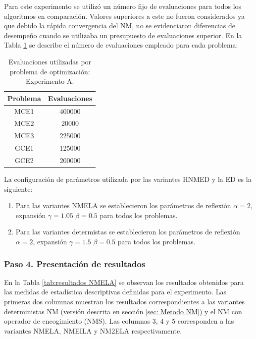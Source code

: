  Para este experimento se utilizó un número fijo de evaluaciones para todos los algoritmos en comparación. Valores superiores a este no fueron considerados ya que debido la rápida convergencia del NM, no se evidenciaron diferencias de desempeño cuando se utilizaba un presupuesto de evaluaciones superior. En la Tabla \ref{tab:Evaluaciones utilizadas por problema de optimización: Experimento A.} se describe el número de evaluaciones empleado para cada problema:
 
 \begin{table}[hb]
 	\centering
 	\caption{Evaluaciones utilizadas por problema de optimización: Experimento A.}
 	\label{tab:Evaluaciones utilizadas por problema de optimización: Experimento A.}
 	\begin{tabular}{cc}
 		\textbf{Problema} &   \textbf{Evaluaciones}     \\
 		\hline
 		MCE1   &   400000       \\
 		MCE2   &   20000       \\
 		MCE3   &   225000      \\
 		GCE1   &   125000       \\
 		GCE2   &   200000      \\
 	\end{tabular}
 \end{table}
 La configuración de parámetros utilizada por las variantes HNMED y la ED es la siguiente:
 \begin{enumerate}
 	\item Para las variantes NMELA se establecieron los parámetros de reflexión $\alpha=2$, expansión $\gamma=1.05$ $\beta=0.5$ para todos los problemas.
 	 	\item Para las variantes determistas se establecieron los parámetros de reflexión $\alpha=2$, expansión $\gamma=1.5$ $\beta=0.5$ para todos los problemas.
 \end{enumerate}
 
 \subsubsection{Paso 4. Presentación de resultados}\label{sec: Presentación de resultados Experimento C}
 En la Tabla \ref{tab:resultados NMELA} se observan los resultados obtenidos para las medidas de estadística descriptivas definidas para el experimento. Las primeras dos columnas muestran los resultados correspondientes a las variantes deterministas NM (versión descrita en sección \ref{sec: Metodo NM}) y el NM con operador de encogimiento (NMS). Las columnas 3, 4 y 5 corresponden a las variantes NMELA, NMEILA y NM2ELA respectivamente.
 
